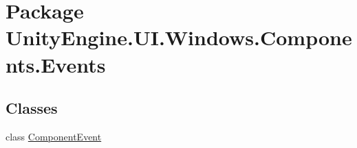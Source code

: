 \hypertarget{namespace_unity_engine_1_1_u_i_1_1_windows_1_1_components_1_1_events}{}\section{Package Unity\+Engine.\+U\+I.\+Windows.\+Components.\+Events}
\label{namespace_unity_engine_1_1_u_i_1_1_windows_1_1_components_1_1_events}
\subsection*{Classes}
\begin{DoxyCompactItemize}
\item 
class \hyperlink{class_unity_engine_1_1_u_i_1_1_windows_1_1_components_1_1_events_1_1_component_event}{Component\+Event}
\end{DoxyCompactItemize}
